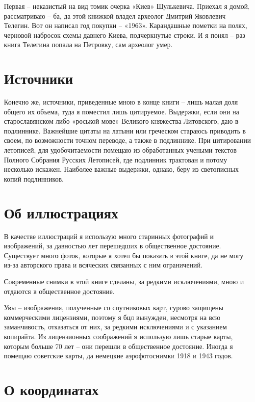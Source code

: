Первая – неказистый на вид томик очерка «Киев» Шулькевича. Приехал я домой, рассматриваю – ба, да  этой книжкой владел археолог Дмитрий Яковлевич Телегин. Вот он написал год покупки – «1963». Карандашные пометки на полях, черновой набросок схемы давнего Киева, подчеркнутые строки. И я понял – раз книга Телегина попала на Петровку, сам археолог умер.

\section*{Источники} 

Конечно же, источники, приведенные мною в конце книги – лишь малая доля общего их объема, туда я поместил лишь цитируемое. Выдержки, если они на старославянском либо «роськой мове» Великого княжества Литовского, даю в подлиннике. Важнейшие цитаты на латыни или греческом стараюсь приводить в своем, по возможности точном переводе, а также в подлиннике. При цитировании летописей, для удобочитаемости помещаю из обработанных учеными текстов Полного Собрания Русских Летописей, где подлинник трактован и потому несколько искажен. Наиболее важные выдержки, однако, беру из светописных копий подлинников.

\section*{Об иллюстрациях} 

В качестве иллюстраций я использую много старинных фотографий и изображений, за давностью лет перешедших в общественное достояние. Существует много фоток, которые я хотел бы показать в этой книге, да не могу из-за авторского права и всяческих связанных с ним ограничений.

Современные снимки в этой книге сделаны, за редкими исключениями, мною и отдаются в общественное достояние.

Увы – изображения, полученные со спутниковых карт, сурово защищены коммерческими лицензиями, поэтому я бцл вынужден, несмотря на всю заманчивость, отказаться от них, за редкими исключениями и с указанием копирайта. Из лицензионных соображений я использую лишь старые карты, которым больше 70 лет – они перешли в общественное достояние. Иногда я помещаю советские карты, да немецкие аэрофотоснимки 1918 и 1943 годов.

\section*{О координатах}

